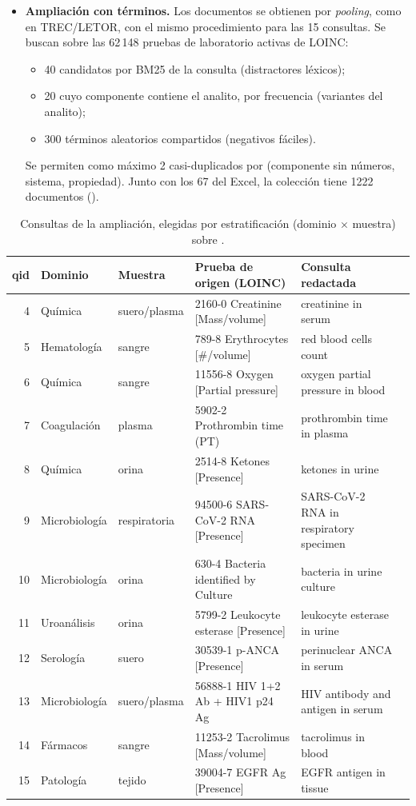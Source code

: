 \documentclass[11pt,a4paper]{article}
\begin{document}
\begin{itemize}
\item \textbf{Ampliación con términos.} Los documentos se obtienen por \emph{pooling}, como en TREC/LETOR, con el mismo procedimiento para las 15 consultas.
  Se buscan sobre las 62\,148 pruebas de laboratorio activas de LOINC:
  \begin{itemize}
  \item 40 candidatos por BM25 de la consulta (distractores léxicos);
  \item 20 cuyo componente contiene el analito, por frecuencia (variantes del analito);
  \item 300 términos aleatorios compartidos (negativos fáciles).
  \end{itemize}
  Se permiten como máximo 2 casi-duplicados por (componente sin números, sistema, propiedad). Junto con los 67 del Excel,
  la colección tiene 1222 documentos ().
\end{itemize}

\begin{table}[h]
\centering\small
\begin{tabular}{rlllll}
\toprule
qid & Dominio & Muestra & Prueba de origen (LOINC) & Consulta redactada \\
\midrule
4 & Química & suero/plasma & 2160-0 Creatinine [Mass/volume] & creatinine in serum \\
5 & Hematología & sangre & 789-8 Erythrocytes [\#/volume] & red blood cells count \\
6 & Química & sangre & 11556-8 Oxygen [Partial pressure] & oxygen partial pressure in blood \\
7 & Coagulación & plasma & 5902-2 Prothrombin time (PT) & prothrombin time in plasma \\
8 & Química & orina & 2514-8 Ketones [Presence] & ketones in urine \\
9 & Microbiología & respiratoria & 94500-6 SARS-CoV-2 RNA [Presence] & SARS-CoV-2 RNA in respiratory specimen \\
10 & Microbiología & orina & 630-4 Bacteria identified by Culture & bacteria in urine culture \\
11 & Uroanálisis & orina & 5799-2 Leukocyte esterase [Presence] & leukocyte esterase in urine \\
12 & Serología & suero & 30539-1 p-ANCA [Presence] & perinuclear ANCA in serum \\
13 & Microbiología & suero/plasma & 56888-1 HIV 1+2 Ab + HIV1 p24 Ag & HIV antibody and antigen in serum \\
14 & Fármacos & sangre & 11253-2 Tacrolimus [Mass/volume] & tacrolimus in blood \\
15 & Patología & tejido & 39004-7 EGFR Ag [Presence] & EGFR antigen in tissue \\
\bottomrule
\end{tabular}
\caption{Consultas de la ampliación, elegidas por estratificación (dominio $\times$ muestra) sobre .}
\label{tab:queries}
\end{table}
\end{document}
